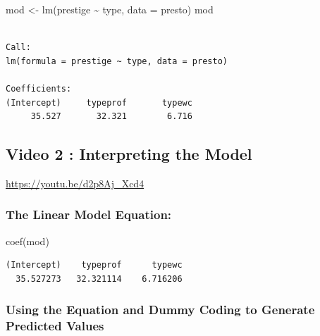 \documentclass[
  letterpaper,
  DIV=11,
  numbers=noendperiod,
  oneside]{scrreprt}
\newenvironment{Shaded}{\begin{snugshade}}{\end{snugshade}}
\newcommand{\AttributeTok}[1]{\textcolor[rgb]{0.40,0.45,0.13}{#1}}
\newcommand{\FunctionTok}[1]{\textcolor[rgb]{0.28,0.35,0.67}{#1}}
\newcommand{\NormalTok}[1]{\textcolor[rgb]{0.00,0.23,0.31}{#1}}
\newcommand{\OtherTok}[1]{\textcolor[rgb]{0.00,0.23,0.31}{#1}}
\newcommand{\SpecialCharTok}[1]{\textcolor[rgb]{0.37,0.37,0.37}{#1}}
\begin{document}
\begin{Shaded}
\begin{Highlighting}[]
\NormalTok{mod }\OtherTok{\textless{}{-}} \FunctionTok{lm}\NormalTok{(prestige }\SpecialCharTok{\textasciitilde{}}\NormalTok{ type, }\AttributeTok{data =}\NormalTok{ presto)}
\NormalTok{mod}
\end{Highlighting}
\end{Shaded}

\begin{verbatim}

Call:
lm(formula = prestige ~ type, data = presto)

Coefficients:
(Intercept)     typeprof       typewc  
     35.527       32.321        6.716  
\end{verbatim}

\subsection{\texorpdfstring{\textbf{Video 2 : Interpreting the
Model}}{Video 2 : Interpreting the Model}}\label{video-2-interpreting-the-model}

\url{https://youtu.be/d2p8Aj_Xcd4}

\subsubsection{\texorpdfstring{\textbf{The Linear Model
Equation:}}{The Linear Model Equation:}}\label{the-linear-model-equation}

\begin{Shaded}
\begin{Highlighting}[]
\FunctionTok{coef}\NormalTok{(mod)}
\end{Highlighting}
\end{Shaded}

\begin{verbatim}
(Intercept)    typeprof      typewc 
  35.527273   32.321114    6.716206 
\end{verbatim}

\subsubsection{\texorpdfstring{\textbf{Using the Equation and Dummy
Coding to Generate Predicted
Values}}{Using the Equation and Dummy Coding to Generate Predicted Values}}\label{using-the-equation-and-dummy-coding-to-generate-predicted-values}
\end{document}
